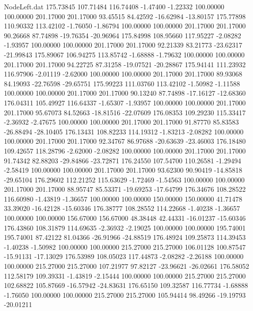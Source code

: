 \begin{filecontents}{NodeLeft.dat}
 175.73845  107.71484  116.74408    -1.47400   -1.22332  100.00000  100.00000  201.17000  201.17000   93.45515   84.42592  -16.62984  -13.80157
 175.77898  110.90332  113.42102    -1.76050   -1.86794  100.00000  100.00000  201.17000  201.17000   90.26668   87.74898  -19.76354  -20.96964
 175.84998  108.95660  117.95227    -2.08282   -1.93957  100.00000  100.00000  201.17000  201.17000   92.21339   83.21773  -23.62317  -21.99843
 175.89067  106.94275  113.85742    -1.68888   -1.79632  100.00000  100.00000  201.17000  201.17000   94.22725   87.31258  -19.07521  -20.28867
 175.94141  111.23932  116.97906    -2.01119   -2.62000  100.00000  100.00000  201.17000  201.17000   89.93068   84.19093  -22.76598  -29.65751
 175.99223  111.03760  113.42102    -1.50982   -1.11588  100.00000  100.00000  201.17000  201.17000   90.13240   87.74898  -17.16127  -12.68360
 176.04311  105.49927  116.64337    -1.65307   -1.93957  100.00000  100.00000  201.17000  201.17000   95.67073   84.52663  -18.81516  -22.07609
 176.08353  109.29230  115.33417    -2.36932   -2.47675  100.00000  100.00000  201.17000  201.17000   91.87770   85.83583  -26.88494  -28.10405
 176.13431  108.82233  114.19312    -1.83213   -2.08282  100.00000  100.00000  201.17000  201.17000   92.34767   86.97688  -20.63639  -23.46003
 176.18480  109.42657  118.28796    -2.62000   -2.08282  100.00000  100.00000  201.17000  201.17000   91.74342   82.88203  -29.84866  -23.72871
 176.24550  107.54700  110.26581    -1.29494   -2.58419  100.00000  100.00000  201.17000  201.17000   93.62300   90.90419  -14.85818  -29.65104
 176.29602  112.21252  115.63629    -1.72469   -1.54563  100.00000  100.00000  201.17000  201.17000   88.95747   85.53371  -19.69253  -17.64799
 176.34676  108.28522  116.60980    -1.43819   -1.36657  100.00000  100.00000  150.00000  150.00000   41.71478   33.39020  -16.42128  -15.60346
 176.38777  108.28552  114.22668    -1.40238   -1.36657  100.00000  100.00000  156.67000  156.67000   48.38448   42.44331  -16.01237  -15.60346
 176.43860  108.31879  114.69635    -2.36932   -2.19025  100.00000  100.00000  195.74001  195.74001   87.42122   81.04366  -26.91966  -24.88519
 176.48924  109.25873  114.39453    -1.40238   -1.50982  100.00000  100.00000  215.27000  215.27000  106.01128  100.87547  -15.91131  -17.13029
 176.53989  108.05023  117.44873    -2.08282   -2.26188  100.00000  100.00000  215.27000  215.27000  107.21977   97.82127  -23.96621  -26.02661
 176.58052  112.58179  109.39331    -1.43819   -2.15444  100.00000  100.00000  215.27000  215.27000  102.68822  105.87669  -16.57942  -24.83631
 176.65150  109.32587  116.77734    -1.68888   -1.76050  100.00000  100.00000  215.27000  215.27000  105.94414   98.49266  -19.19793  -20.01211

\end{filecontents}
